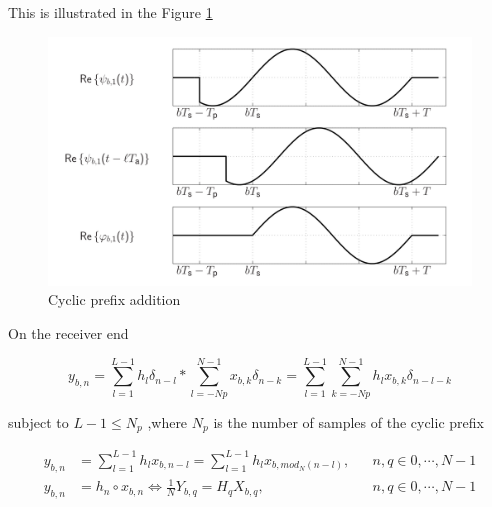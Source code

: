 This is illustrated in the Figure \ref{fig:CPIlls}

\begin{figure}[H]
    \begin{center}
        \includegraphics[width=\linewidth]{images/CP_illustration.png}
        \caption{Cyclic prefix addition \cite{UtschickOFDM}}
        \label{fig:CPIlls}
    \end{center}
\end{figure}

On the receiver end

\begin{equation}
    y_{b,n} = \sum_{l=1}^{L-1}h_l\delta_{n-l} \ast \sum_{l=-Np}^{N-1}x_{b,k}\delta_{n-k} = \sum_{l=1}^{L-1}\sum_{k=-Np}^{N-1}h_lx_{b,k}\delta_{n-l-k}
\end{equation}

subject to $L-1 \leq N_p$ ,where $N_p$ is the number of samples of the cyclic prefix

\begin{equation}
    \begin{aligned}
        y_{b,n} & = \sum_{l=1}^{L-1}h_lx_{b,n-l} = \sum_{l=1}^{L-1}h_lx_{b,mod_N(n-l)}, & & n,q \in 0,\cdots ,N-1
        \\
        y_{b,n} & = h_n \circ x_{b,n} \Leftrightarrow \frac{1}{N}Y_{b,q} = H_qX_{b,q}, & & n,q \in 0,\cdots,N-1
    \end{aligned}
\end{equation}

